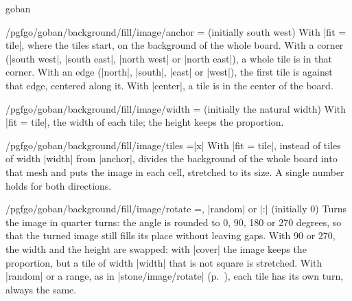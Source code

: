 \begin{environment}{{goban}}
	\begin{key}{/pgfgo/goban/background/fill/image/anchor = (initially south west)}
		With |fit = tile|, where the tiles start, on the background of the whole board. With a corner (|south west|, |south east|, |north west| or |north east|), a whole tile is in that corner. With an edge (|north|, |south|, |east| or |west|), the first tile is against that edge, centered along it. With |center|, a tile is in the center of the board.

		\begin{codeexample}[]
			\begin{goban}[5, background = {fill = {image = {
				file = pgfgo-tile.png, fit = tile, width = 1cm, anchor = north east}}}]
			\end{goban}

			\begin{goban}[5, background = {fill = {image = {
				file = pgfgo-tile.png, fit = tile, width = 1cm, anchor = north}}}]
			\end{goban}
		\end{codeexample}
	\end{key}

	\begin{key}{/pgfgo/goban/background/fill/image/width = (initially the natural width)}
		With |fit = tile|, the width of each tile; the height keeps the proportion.
	\end{key}

	\begin{key}{/pgfgo/goban/background/fill/image/tiles =|x|}
		With |fit = tile|, instead of tiles of width |width| from |anchor|, divides the background of the whole board into that mesh and puts the image in each cell, stretched to its size. A single number holds for both directions.

		\begin{codeexample}[]
			\begin{goban}[9, background = {fill = {image = {
				file = pgfgo-cell.png, fit = tile, tiles = 3x3}}}]
			\end{goban}
		\end{codeexample}
	\end{key}

	\begin{key}{/pgfgo/goban/background/fill/image/rotate =, |random| or |:| (initially 0)}
		Turns the image in quarter turns: the angle is rounded to 0, 90, 180 or 270 degrees, so that the turned image still fills its place without leaving gaps. With 90 or 270, the width and the height are swapped: with |cover| the image keeps the proportion, but a tile of width |width| that is not square is stretched. With |random| or a range, as in |stone/image/rotate| (p.~\pageref{subsec:piedrasimagen}), each tile has its own turn, always the same.


\end{key}
\end{environment}
